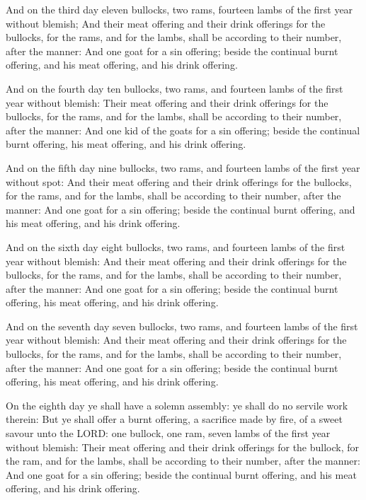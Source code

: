 \Verse And on the third day eleven bullocks, two rams, fourteen lambs
of the first year without blemish; \Verse And their meat offering and
their drink offerings for the bullocks, for the rams, and for the
lambs, shall be according to their number, after the manner: \Verse And
one goat for a sin offering; beside the continual burnt offering, and
his meat offering, and his drink offering.

\Verse And on the fourth day ten bullocks, two rams, and fourteen lambs
of the first year without blemish: \Verse Their meat offering and their
drink offerings for the bullocks, for the rams, and for the lambs,
shall be according to their number, after the manner: \Verse And one
kid of the goats for a sin offering; beside the continual burnt
offering, his meat offering, and his drink offering.

\Verse And on the fifth day nine bullocks, two rams, and fourteen lambs
of the first year without spot: \Verse And their meat offering and
their drink offerings for the bullocks, for the rams, and for the
lambs, shall be according to their number, after the manner: \Verse And
one goat for a sin offering; beside the continual burnt offering, and
his meat offering, and his drink offering.

\Verse And on the sixth day eight bullocks, two rams, and fourteen
lambs of the first year without blemish: \Verse And their meat offering
and their drink offerings for the bullocks, for the rams, and for the
lambs, shall be according to their number, after the manner: \Verse And
one goat for a sin offering; beside the continual burnt offering, his
meat offering, and his drink offering.

\Verse And on the seventh day seven bullocks, two rams, and fourteen
lambs of the first year without blemish: \Verse And their meat offering
and their drink offerings for the bullocks, for the rams, and for the
lambs, shall be according to their number, after the manner: \Verse And
one goat for a sin offering; beside the continual burnt offering, his
meat offering, and his drink offering.

\Verse On the eighth day ye shall have a solemn assembly: ye shall do
no servile work therein: \Verse But ye shall offer a burnt offering, a
sacrifice made by fire, of a sweet savour unto the LORD: one bullock,
one ram, seven lambs of the first year without blemish: \Verse Their
meat offering and their drink offerings for the bullock, for the ram,
and for the lambs, shall be according to their number, after the
manner: \Verse And one goat for a sin offering; beside the continual
burnt offering, and his meat offering, and his drink offering.

